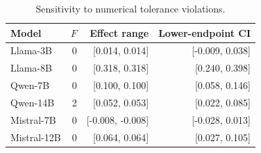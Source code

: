 \begin{table}[H]
\centering
\small
\setlength{\tabcolsep}{2pt}
\caption{Sensitivity to numerical tolerance violations.}
\label{tab:frozen-sensitivity}
\begin{tabular*}{\linewidth}{@{\extracolsep{\fill}}lrrr@{}}
\toprule
Model & $F$ & Effect range & Lower-endpoint CI \\
\midrule
Llama-3B & 0 & [0.014, 0.014] & [-0.009, 0.038] \\
Llama-8B & 0 & [0.318, 0.318] & [0.240, 0.398] \\
Qwen-7B & 0 & [0.100, 0.100] & [0.058, 0.146] \\
Qwen-14B & 2 & [0.052, 0.053] & [0.022, 0.085] \\
Mistral-7B & 0 & [-0.008, -0.008] & [-0.028, 0.013] \\
Mistral-12B & 0 & [0.064, 0.064] & [0.027, 0.105] \\
\bottomrule
\end{tabular*}
\end{table}
